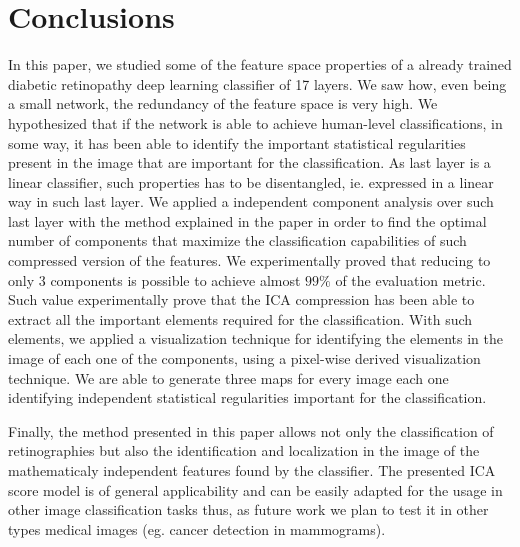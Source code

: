 \documentclass[review]{elsarticle}
\theoremstyle{definition} %
\theoremstyle{remark}
\begin{document}
\section{Conclusions}\label{sec:conclusions}

In this paper, we studied some of the feature space properties of a already trained diabetic retinopathy deep learning classifier of 17 layers. We saw how, even being a small network, the redundancy of the feature space is very high. We hypothesized that if the network is able to achieve human-level classifications, in some way, it has been able to identify the important statistical regularities present in the image that are important for the classification. As last layer is a linear classifier, such properties has to be disentangled, ie. expressed in a linear way in such last layer. We applied a independent component analysis over such last layer with the method explained in the paper in order to find the optimal number of components that maximize the classification capabilities of such compressed version of the features. We experimentally proved that reducing to only 3 components is possible to achieve almost $99\%$ of the evaluation metric. Such value experimentally prove that the ICA compression has been able to extract all the important elements required for the classification. With such elements, we applied a visualization technique for identifying the elements in the image of each one of the components, using a pixel-wise derived visualization technique. We are able to generate three maps for every image each one identifying independent statistical regularities important for the classification.


Finally, the method presented in this paper allows not only the classification of retinographies but also the identification and localization in the image of the mathematicaly independent features found by the classifier. The presented ICA score model is of general applicability and can be easily adapted for the usage in other image classification tasks thus, as future work we plan to test it in other types medical images (eg. cancer detection in mammograms).
\end{document}
